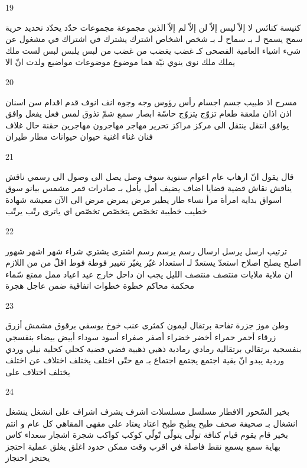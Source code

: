 \documentclass[twocolumn,a4paper]{article}
\begin{document}
19

\textarabic{ كنيسة  كنائس  
 لا إلاّ ليس إلاّ لن إلاّ  لم إلاّ  
 الذين  
 مجموعة  مجموعات
 حدّد  يحدّد   
 تحديد  
 حرية  
 سمح  يسمح لـ بـ  
 سماح لـ بـ  
 شخص  اشخاص  
 اشترك  يشترك في   
 اشتراك في  
 مشغول عن  
 شيء  اشياء  
 العامية  
 الفصحى  
 كـ  
 غضب  يغضب من   
 غضب من  
 لبس  يلبس   
 لبس  
 لست  
 ملك  يملك  
 ملك  
 نوى  ينوي  
 نيّة  
 هما  
 موضوع  موضوعات
 مواضيع  
 ولدت  
 انّ  
 الا  
}

20

\textarabic{ مسرح  
 اذ  
 طبيب  
 جسم  اجسام  
 رأس  رؤوس  
 وجه  وجوه  
 انف  انوف  
 قدم  اقدام  
 سن  اسنان  
 اذن  اذان  
 ملعقة  
 طعام  
 تزوّج  يتزوّج   
 حاسّة  
 ابصار  
 سمع  
 شمّ  
 تذوق  
 لمس  
 فعل  يفعل   
 وافق  يوافق   
 انتقل  ينتقل الى  
 مركز  مراكز  
 تحرير  
 مهاجر  مهاجرون
  مهاجرين
  حقنة  
 حال  
 غلاف  
 فنان  
 غناء  
 اغنية  
 حيوان  حيوانات
 مطار  
 طيران  
}

21

\textarabic{ قال  يقول انّ   
 ارهاب  
 عام  اعوام  
 سنوية  
 سوف  
 وصل  يصل الى  
 وصول الى  
 رسمي  
 ناقش  يناقش  
 نقاش  
 قضية  قضايا  
 اضاف  يضيف   
 أمل  يأمل بـ   
 صادرات  
 قمر  
 مشمس  
 بيانو  
 سوق  اسواق  
 بداية  
 امرأة  مرأ  
 نساء  
 طار  يطير   
 مرض  يمرض   
 مرض  
 الى اﻵن  
 معيشة  
 شهادة  
 خطيب  خطيبة  
 تخصّص  يتخصّص   
 تخصّص  
 اي  
 ياترى  
 رتّب  يرتّب   
}

22

\textarabic{ ترتيب  
 ارسل  يرسل  ارسال   
 رسم  يرسم   
 رسم  
 اشترى  يشتري   
 شراء  
 شهر  اشهر  شهور  
 اصلح  يصلح  اصلاح   
 استعدّ  يستعدّ لـ  استعداد   
 غيّر  يغيّر  تغيير   
 فوطة  فوط  
 اقلّ من  
 من اللازم ان  
 ملاية  ملايات
 منتصف  
 منتصف الليل  
 يجب ان  
 داحل  
 خارج  
 عيد  اعياد  
 ممل  
 ممتع  
 سّماء  
 محكمة  محاكم  
 خطوة  خطوات
 اتفاقية  
 ضمن  
 عاجل  
 هجرة  
}

23

\textarabic{ وطن  
 موز  
 جزرة  
 تفاحة  
 برتقال  
 ليمون  
 كمثرى  
 عنب  
 خوخ  
 يوسفي  
 برقوق  
 مشمش  
 أزرق  زرقاء  
 أحمر  حمراء  
 أخضر  خضراء  
 أصفر  صفراء  
 أسود  سوداء  
 أبيض  بيضاء  
 بنفسجي  بنفسجية  
 برتقالي  برتقالية  
 رمادي  رمادية  
 ذهبي  ذهبية  
 فضي  فضية  
 كحلي  كحلية  
 نيلي  
 وردي  وردية  
 يبدو انّ  
 بقية  
 اجتمع  يجتمع  اجتماع بـ  مع   
 حتّى  
 اختلف  يختلف  اختلاف عن   
 اختلف  يختلف  اختلاف على   
}

24

\textarabic{ بخير  
 السّحور  
 الافطار  
 مسلسل  مسلسلات
 اشرف  يشرف  اشراف على  
 انشغل  ينشغل  انشغال بـ  
 صحيفة  صحف  
 طبخ  يطبخ  
 طبخ  
 اعتاد  يعتاد على  
 مقهى المقاهي  
 كل عام و انتم بخير  
 قام  يقوم  
 قيام  
 كنافة  
 تولّى  يتولّى  
 تّولّي  
 كوكب  كواكب  
 شجرة  اشجار   
 سعداء  
 كاس  
 بهاية  
 سمع  يسمع  
 نقط  
 فاصلة  
 في اقرب وقت ممكن  
 حدود  
 اغلق  يغلق   
 عملية  
 احتجز  يحتجز  احتجاز   
}
\end{document}
